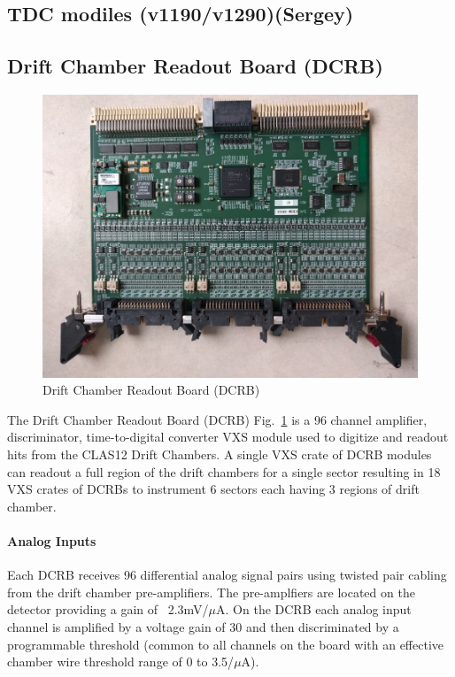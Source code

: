 \subsection{TDC modiles (v1190/v1290)(Sergey)}

\subsection{Drift Chamber Readout Board (DCRB)}

\begin{figure}[hbt]
	\centering
	\includegraphics[width=1.0\columnwidth,keepaspectratio]{img/dcrb_board.png}
	\caption{Drift Chamber Readout Board (DCRB)}
	\label{fig:dcrb_board}
\end{figure}

The Drift Chamber Readout Board (DCRB) Fig.~\ref{fig:dcrb_board} is a 96 channel amplifier, discriminator, time-to-digital converter VXS module used to digitize and readout hits from the CLAS12 Drift Chambers. A single VXS crate of DCRB modules can readout a full region of the drift chambers for a single sector resulting in 18 VXS crates of DCRBs to instrument 6 sectors each having 3 regions of drift chamber.

\paragraph{Analog Inputs}
Each DCRB receives 96 differential analog signal pairs using twisted pair cabling from the drift chamber pre-amplifiers. The pre-amplfiers are located on the detector providing a gain of ~2.3mV/$\mu$A. On the DCRB each analog input channel is amplified by a voltage gain of 30 and then discriminated by a programmable threshold (common to all channels on the board with an effective chamber wire threshold range of 0 to 3.5/$\mu$A).

